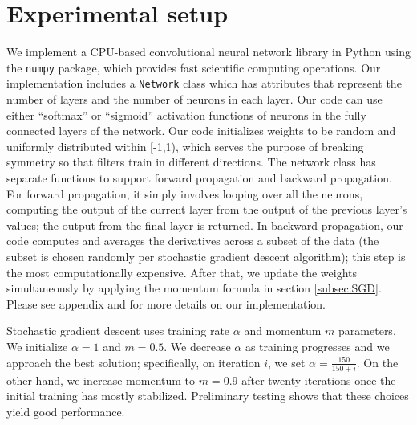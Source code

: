 \documentclass[10pt,twocolumn]{article}
\begin{document}
\section{Experimental setup}

We implement a CPU-based convolutional neural network library \cite{git:cnn} in Python using the \texttt{numpy} package, which provides fast scientific computing operations. Our implementation includes a \texttt{Network} class which has attributes that represent the number of layers and the number of neurons in each layer. Our code can use either ``softmax'' or ``sigmoid'' activation functions of neurons in the fully connected layers of the network. Our code initializes weights to be random and uniformly distributed within [-1,1), which serves the purpose of breaking symmetry so that filters train in different directions. The network class has separate functions to support forward propagation and backward propagation. For forward propagation, it simply involves looping over all the neurons, computing the output of the current layer from the output of the previous layer's values; the output from the final layer is returned. In backward propagation, our code computes and averages the derivatives across a subset of the data (the subset is chosen randomly per stochastic gradient descent algorithm); this step is the most computationally expensive. After that, we update the weights simultaneously by applying the momentum formula in section \ref{subsec:SGD}. Please see appendix and \cite{git:cnn} for more details on our implementation.

Stochastic gradient descent uses training rate $\alpha$ and momentum $m$ parameters. We initialize $\alpha = 1$ and $m = 0.5$. We decrease $\alpha$ as training progresses and we approach the best solution; specifically, on iteration $i$, we set $\alpha = \frac{150}{150 + i}$. On the other hand, we increase momentum to $m = 0.9$ after twenty iterations once the initial training has mostly stabilized. Preliminary testing shows that these choices yield good performance.
\end{document}
